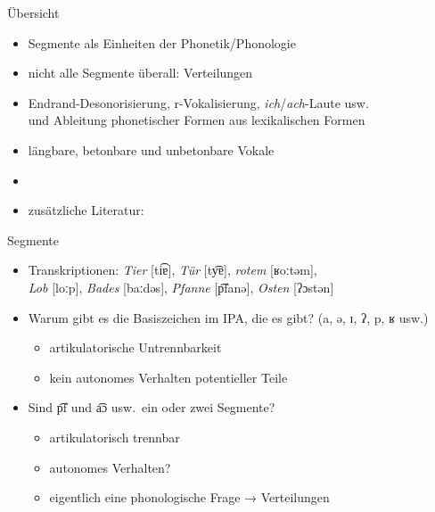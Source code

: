 \begin{frame}
  {Übersicht}
  \pause
  \begin{itemize}[<+->]
    \item \alert{Segmente} als Einheiten der Phonetik\slash Phonologie
    \item nicht alle Segmente überall: \alert{Verteilungen}
    \item Endrand-Desonorisierung, r-Vokalisierung, \textit{ich}\slash\textit{ach}-Laute usw.\\
      und \alert{Ableitung} phonetischer Formen aus lexikalischen Formen
    \item längbare, betonbare und unbetonbare Vokale
      \Zeile
    \item \citet[Abschnitt~5.1]{Schaefer2018b}
    \item zusätzliche Literatur: \citet{Eisenberg2013a}
  \end{itemize}
\end{frame}

\begin{frame}
  {Segmente}
  \pause
  \begin{itemize}[<+->]
    \item Transkriptionen: \textit{Tier} [ti͡ɐ], \textit{Tür} [ty͡ɐ], \textit{rotem} [ʁoːtəm],\\
      \textit{Lob} [loːp], \textit{Bades} [baːdəs], \textit{Pfanne} [p͡fanə], \textit{Osten} [ʔɔstən]
      \vspace{\baselineskip}
    \item Warum gibt es die Basiszeichen im IPA, die es gibt? (a, ə, ɪ, ʔ, p, ʁ usw.)
      \begin{itemize}
        \item \alert{artikulatorische Untrennbarkeit}
        \item \alert{kein autonomes Verhalten potentieller Teile}
      \end{itemize}
      \vspace{\baselineskip}
    \item Sind p͡f und a͡ɔ usw.\ ein oder zwei Segmente? 
      \begin{itemize}
        \item artikulatorisch trennbar
        \item autonomes Verhalten?
        \item eigentlich eine phonologische Frage → Verteilungen
      \end{itemize}
  \end{itemize}
\end{frame}

